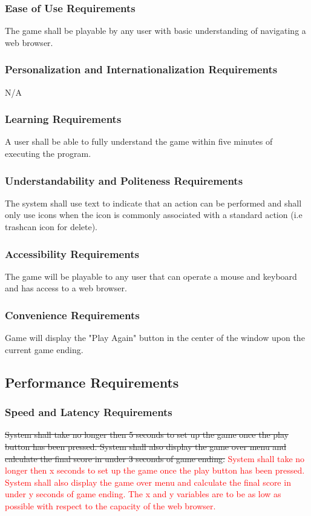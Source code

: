 \documentclass[12pt, titlepage]{article}
\begin{document}
\subsubsection{Ease of Use Requirements}
The game shall be playable by any user with basic understanding of navigating a web browser.
\subsubsection{Personalization and Internationalization Requirements}
N/A
\subsubsection{Learning Requirements}
A user shall be able to fully understand the game within five minutes of executing the program.
\subsubsection{Understandability and Politeness Requirements }
The system shall use text to indicate that an action can be performed and shall only use icons when the icon is commonly associated with a standard action (i.e trashcan icon for delete).
\subsubsection{Accessibility Requirements}
The game will be playable to any user that can operate a mouse and keyboard and has access to a web browser.
\subsubsection{Convenience Requirements}
Game will display the "Play Again" button in the center of the window upon the current game ending.


\subsection{Performance Requirements}
\subsubsection{Speed and Latency Requirements}
\sout{System shall take no longer then 5 seconds to set up the game once the play button has been pressed. System shall also display the game over menu and calculate the final score in under 3 seconds of game ending.}
\textcolor{red}{System shall take no longer then x seconds to set up the game once the play button has been pressed. System shall also display the game over menu and calculate the final score in under y seconds of game ending. The x and y variables are to be as low as possible with respect to the capacity of the web browser.}
\end{document}
